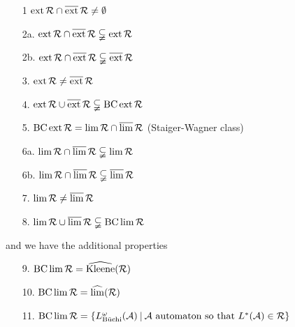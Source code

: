 \begin{lemma}
\label{P:reg-star}

\begin{enumerate}
\item[1] $\operatorname{ext} \mathcal{R} \cap \operatorname{\overline{ext}} \mathcal{R} \neq \emptyset$
\item[2a.] $\operatorname{ext} \mathcal{R} \cap \operatorname{\overline{ext}} \mathcal{R} \subsetneqq \operatorname{ext} \mathcal{R}$
\item[2b.] $\operatorname{ext} \mathcal{R} \cap \operatorname{\overline{ext}} \mathcal{R} \subsetneqq \operatorname{\overline{ext}} \mathcal{R}$
\item[3.] $\operatorname{ext} \mathcal{R} \neq \operatorname{\overline{ext}} \mathcal{R}$
\item[4.] $\operatorname{ext} \mathcal{R} \cup \operatorname{\overline{ext}} \mathcal{R} \subsetneqq \operatorname{BC} \operatorname{ext} \mathcal{R}$
\item[5.] $\operatorname{BC} \operatorname{ext} \mathcal{R} = \lim \mathcal{R} \cap \operatorname{\overline{lim}} \mathcal{R}$ (Staiger-Wagner class)
\item[6a.] $\lim \mathcal{R} \cap \operatorname{\overline{lim}} \mathcal{R} \subsetneqq \lim \mathcal{R}$
\item[6b.] $\lim \mathcal{R} \cap \operatorname{\overline{lim}} \mathcal{R} \subsetneqq \operatorname{\overline{lim}} \mathcal{R}$
\item[7.] $\lim \mathcal{R} \neq \operatorname{\overline{lim}} \mathcal{R}$
\item[8.] $\lim \mathcal{R} \cup \operatorname{\overline{lim}} \mathcal{R} \subsetneqq \operatorname{BC} \lim \mathcal{R}$
\end{enumerate}
and we have the additional properties
\begin{enumerate}
\item[9.] $\operatorname{BC} \lim \mathcal{R} = \operatorname{\widehat{Kleene}}(\mathcal{R})$
\item[10.] $\operatorname{BC} \lim \mathcal{R} = \operatorname{\widehat{lim}}(\mathcal{R})$
\item[11.] $\BC \lim \mathcal{R} = \Set{L_{\text{Büchi}}^\omega(\A)}{\A \text{ automaton so that } L^*(\A) \in \mathcal{R}}$
\end{enumerate}


\end{lemma}
